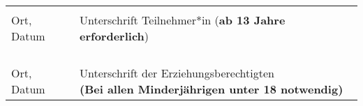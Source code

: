 \begin{Form}
    \vspace*{1cm}
    \footnotesize
    \begin{tabularx}{\linewidth}{p{7cm}X}
        \noindent\hrulefill & \noindent\hrulefill                                            \\
        Ort, Datum          & Unterschrift Teilnehmer*in (\textbf{ab 13 Jahre erforderlich}) \\
        &                                                                \\
        &                                                                \\
        &                                                                \\
        \noindent\hrulefill & \noindent\hrulefill                                            \\
        Ort, Datum          & \makecell[l]{Unterschrift der Erziehungsberechtigten           \\\textbf{(Bei allen Minderjährigen unter 18 notwendig)}}
    \end{tabularx}
\end{Form}
\clearpage
